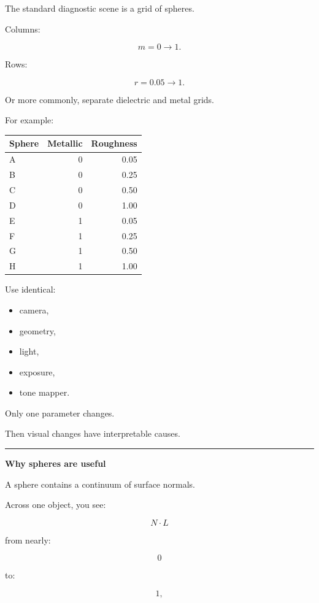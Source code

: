 The standard diagnostic scene is a grid of spheres.

Columns:

\[
m=0\rightarrow1.
\]

Rows:

\[
r=0.05\rightarrow1.
\]

Or more commonly, separate dielectric and metal grids.

For example:

{\def\LTcaptype{none} %
\begin{longtable}[]{@{}lrr@{}}
\toprule\noalign{}
Sphere & Metallic & Roughness \\
\midrule\noalign{}
\endhead
\bottomrule\noalign{}
\endlastfoot
A & 0 & 0.05 \\
B & 0 & 0.25 \\
C & 0 & 0.50 \\
D & 0 & 1.00 \\
E & 1 & 0.05 \\
F & 1 & 0.25 \\
G & 1 & 0.50 \\
H & 1 & 1.00 \\
\end{longtable}
}

Use identical:

\begin{itemize}
\tightlist
\item
  camera,
\item
  geometry,
\item
  light,
\item
  exposure,
\item
  tone mapper.
\end{itemize}

Only one parameter changes.

Then visual changes have interpretable causes.

\begin{center}\rule{0.5\linewidth}{0.5pt}\end{center}

\textbf{Why spheres are useful}

A sphere contains a continuum of surface normals.

Across one object, you see:

\[
N\cdot L
\]

from nearly:

\[
0
\]

to:

\[
1,
\]

